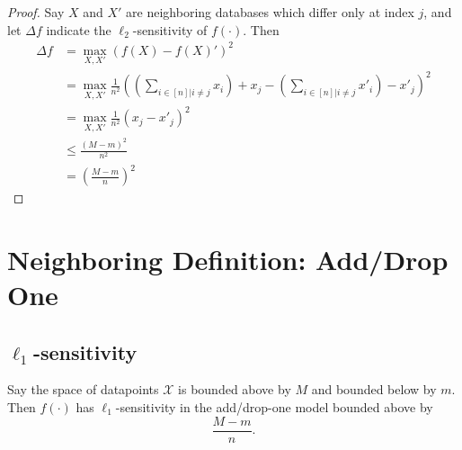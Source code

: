 \documentclass[11pt]{scrartcl} %
\begin{document}
\begin{proof}
	Say $X$ and $X'$ are neighboring databases which differ only at index $j$, and let $\Delta{f}$ indicate the $\ell_2$-sensitivity of $f(\cdot)$. Then
	\begin{align*}
		\Delta{f} &= \max_{X,X'} (f(X) - f(X)')^2 \\
						&= \max_{X,X'} \frac{1}{n^2} \left(
								\left( \sum_{i \in [n] | i \neq j} x_i \right) + x_j -
								\left( \sum_{i \in [n] | i \neq j} x'_i \right) - x'_j
							\right)^2 \\
						&= \max_{X,X'} \frac{1}{n^2} (x_j - x'_j)^2 \\
						&\leq \frac{(M-m)^2}{n^2} \\
						&= \left( \frac{M-m}{n} \right)^2
	\end{align*}
\end{proof}

\section{Neighboring Definition: Add/Drop One}
\subsection{$\ell_1$-sensitivity}

\begin{theorem}
Say the space of datapoints $\mathcal{X}$ is bounded above by $M$ and bounded below by $m$.
Then $f(\cdot)$ has $\ell_1$-sensitivity in the add/drop-one model bounded above by
$$ \frac{M-m}{n}. $$
\end{theorem}
\end{document}
